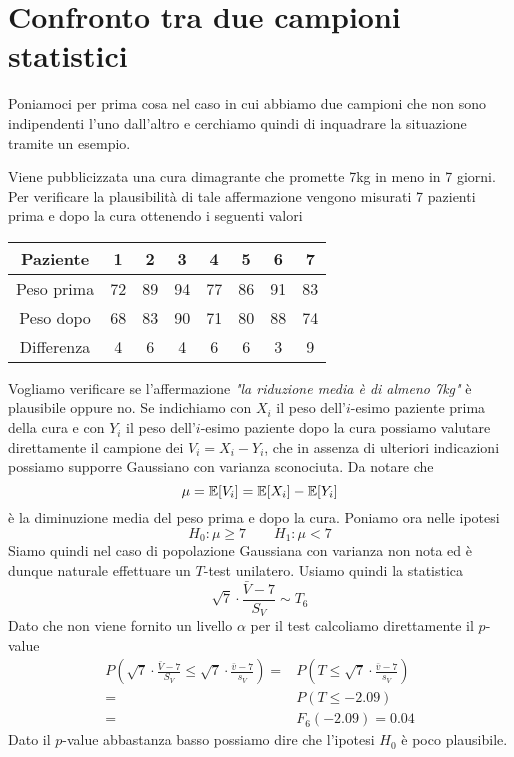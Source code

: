 \section{Confronto tra due campioni statistici}
Poniamoci per prima cosa nel caso in cui abbiamo due campioni che non sono indipendenti l'uno
dall'altro e cerchiamo quindi di inquadrare la situazione tramite un esempio.

\begin{example}
	Viene pubblicizzata una cura dimagrante che promette 7kg in meno in 7 giorni. Per verificare
	la plausibilità di tale affermazione vengono misurati 7 pazienti prima e dopo la cura ottenendo
	i seguenti valori
	\begin{center}
		\begin{tabular}{| c | c | c | c | c | c | c | c |}
			\hline
			Paziente   & 1  & 2  & 3  & 4  & 5  & 6  & 7  \\
			\hline
			Peso prima & 72 & 89 & 94 & 77 & 86 & 91 & 83 \\
			\hline
			Peso dopo  & 68 & 83 & 90 & 71 & 80 & 88 & 74 \\
			\hline
			Differenza & 4  & 6  & 4  & 6  & 6  & 3  & 9  \\
			\hline
		\end{tabular}
	\end{center}
	Vogliamo verificare se l'affermazione \emph{"la riduzione media è di almeno 7kg"} è plausibile
	oppure no. Se indichiamo con $X_i$ il peso dell'$i$-esimo paziente prima della cura e con $Y_i$
	il peso dell'$i$-esimo paziente dopo la cura possiamo valutare direttamente il campione dei
	$V_i = X_i - Y_i$, che in assenza di ulteriori indicazioni possiamo supporre Gaussiano con
	varianza sconociuta. Da notare che
	\[ \mu = \mathbb{E}[V_i] = \mathbb{E}[X_i] - \mathbb{E}[Y_i] \]
	è la diminuzione media del peso prima e dopo la cura. Poniamo ora nelle ipotesi
	\[ H_0 : \mu \geq 7 \qquad H_1 : \mu < 7 \]
	Siamo quindi nel caso di popolazione Gaussiana con varianza non nota ed è dunque naturale
	effettuare un $T$-test unilatero. Usiamo quindi la statistica
	\[ \sqrt{7} \cdot \frac{\bar{V} - 7}{S_V} \sim T_6 \]
	Dato che non viene fornito un livello $\alpha$ per il test calcoliamo direttamente il $p$-value
	\begin{align*}
		P \left( \sqrt{7} \cdot \frac{\bar{V} - 7}{S_V} \leq
		\sqrt{7} \cdot \frac{\bar{v} - 7}{s_V} \right) = &
		P \left( T \leq \sqrt{7} \cdot \frac{\bar{v} - 7}{s_V} \right)                   \\
		=                                                & P \left( T \leq -2.09 \right) \\
		=                                                & F_6 (-2.09) = 0.04
	\end{align*}
	Dato il $p$-value abbastanza basso possiamo dire che l'ipotesi $H_0$ è poco plausibile.
\end{example}

